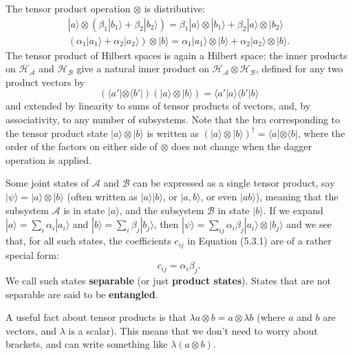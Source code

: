 \documentclass[fleqn]{article}
\renewcommand{\footnote}[1]{\en{#1}}
\begin{document}
The tensor product operation \(\otimes\) is distributive:
\[
  \begin{gathered}
    |a\rangle \otimes \left( \beta_1|b_1\rangle + \beta_2|b_2\rangle \right)
    = \beta_1|a\rangle\otimes|b_1\rangle + \beta_2|a\rangle\otimes|b_2\rangle
  \\\left( \alpha_1|a_1\rangle + \alpha_2|a_2\rangle \right) \otimes |b\rangle
    = \alpha_1|a_1\rangle\otimes|b\rangle + \alpha_2|a_2\rangle\otimes|b\rangle.
  \end{gathered}
\]
The tensor product of Hilbert spaces is again a Hilbert space: the inner products on \(\mathcal{H}_{\mathcal{A}}\) and \(\mathcal{H}_{\mathcal{B}}\) give a natural inner product on \(\mathcal{H}_{\mathcal{A}}\otimes\mathcal{H}_{\mathcal{B}}\), defined for any two product vectors by
\[
  \left( \langle a'|\otimes\langle b'| \right) \left( |a\rangle\otimes|b\rangle \right)
  = \langle a'|a\rangle\langle b'|b\rangle
\]
and extended by linearity to sums of tensor products of vectors, and, by associativity\footnote{\(({\mathcal{H}}_a \otimes {\mathcal{H}}_b)\otimes {\mathcal{H}}_c = {\mathcal{H}}_a \otimes ({\mathcal{H}}_b\otimes {\mathcal{H}}_c)\).}, to any number of subsystems.
Note that the bra corresponding to the tensor product state \(|a\rangle\otimes|b\rangle\) is written as \((|a\rangle\otimes|b\rangle)^\dagger = \langle a|\otimes\langle b|\), where the order of the factors on either side of \(\otimes\) does not change when the dagger operation is applied.

Some joint states of \(\mathcal{A}\) and \(\mathcal{B}\) can be expressed as a single tensor product, say \(|\psi\rangle=|a\rangle\otimes|b\rangle\) (often written as \(|a\rangle|b\rangle\), or \(|a, b\rangle\), or even \(|ab\rangle\)), meaning that the subsystem \(\mathcal{A}\) is in state \(|a\rangle\), and the subsystem \(\mathcal{B}\) in state \(|b\rangle\).
If we expand \(|a\rangle=\sum_i\alpha_i|a_i\rangle\) and \(|b\rangle=\sum_i\beta_j|b_j\rangle\), then \(|\psi\rangle=\sum_{ij}\alpha_i\beta_j|a_i\rangle\otimes|b_j\rangle\) and we see that, for all such states, the coefficients \(c_{ij}\) in Equation (5.3.1) are of a rather special form:
\[
  c_{ij} = \alpha_i\beta_j.
\]
We call such states \textbf{separable} (or just \textbf{product states}).
States that are not separable are said to be \textbf{entangled}.

A useful fact about tensor products is that \(\lambda a\otimes b = a\otimes\lambda b\) (where \(a\) and \(b\) are vectors, and \(\lambda\) is a scalar).
This means that we don't need to worry about brackets, and can write something like \(\lambda(a\otimes b)\).
\end{document}
